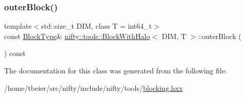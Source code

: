 \mbox{\label{classnifty_1_1tools_1_1BlockWithHalo_ad9ef106320b3d96752fefadc75c7c909}} 
\subsubsection{\texorpdfstring{outer\+Block()}{outerBlock()}}
{\footnotesize\ttfamily template$<$std\+::size\+\_\+t D\+IM, class T  = int64\+\_\+t$>$ \\
const \hyperlink{classnifty_1_1tools_1_1BlockWithHalo_a98d2c04518f8902ab6d985feba605987}{Block\+Type}\& \hyperlink{classnifty_1_1tools_1_1BlockWithHalo}{nifty\+::tools\+::\+Block\+With\+Halo}$<$ D\+IM, T $>$\+::outer\+Block (\begin{DoxyParamCaption}{ }\end{DoxyParamCaption}) const\hspace{0.3cm}{\ttfamily [inline]}}



The documentation for this class was generated from the following file\+:\begin{DoxyCompactItemize}
\item 
/home/tbeier/src/nifty/include/nifty/tools/\hyperlink{blocking_8hxx}{blocking.\+hxx}\end{DoxyCompactItemize}
